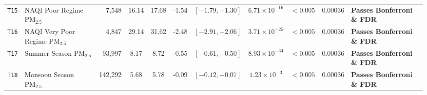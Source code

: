 \begin{table}[t]
\begin{tabular}{llrcccccccl}
\texttt{T15} & NAQI Poor Regime $\text{PM}_{2.5}$ & 7,548 & 16.14 & 17.68 & -1.54 & $[-1.79, -1.30]$ & $6.71 \times 10^{-16}$ & $<0.005$ & $0.00036$ & \textbf{Passes Bonferroni \& FDR} \\
\texttt{T16} & NAQI Very Poor Regime $\text{PM}_{2.5}$ & 4,847 & 29.14 & 31.62 & -2.48 & $[-2.91, -2.06]$ & $3.71 \times 10^{-25}$ & $<0.005$ & $0.00036$ & \textbf{Passes Bonferroni \& FDR} \\
\texttt{T17} & Summer Season $\text{PM}_{2.5}$ & 93,997 & 8.17 & 8.72 & -0.55 & $[-0.61, -0.50]$ & $8.93 \times 10^{-34}$ & $<0.005$ & $0.00036$ & \textbf{Passes Bonferroni \& FDR} \\
\texttt{T18} & Monsoon Season $\text{PM}_{2.5}$ & 142,292 & 5.68 & 5.78 & -0.09 & $[-0.12, -0.07]$ & $1.23 \times 10^{-3}$ & $<0.005$ & $0.00036$ & \textbf{Passes Bonferroni \& FDR} \\
\bottomrule
\end{tabular}
\end{table}
